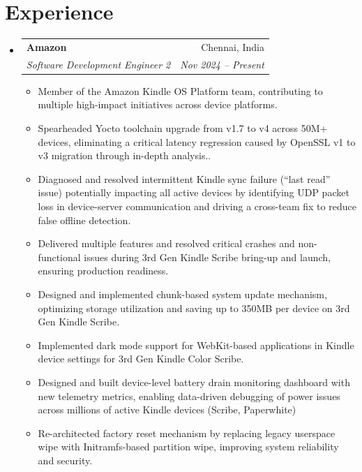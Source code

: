 \documentclass[a4paper,20pt]{article}
\makeatletter
\newcommand{\resumeSubheading}[4]{
  \vspace{-2pt}\item
    \begin{tabular*}{0.97\textwidth}{l@{\extracolsep{\fill}}r}
      \textbf{#1} & #2 \\
      \textit{#3} & \textit{#4} \\
    \end{tabular*}\vspace{-6pt}
}
\newcommand{\resumeItem}[1]{
  \item \small{#1 \vspace{-2pt}}
}
\makeatother
\begin{document}
\section{Experience}
\begin{itemize}[leftmargin=*]

\resumeSubheading
{Amazon}{Chennai, India}
{Software Development Engineer 2}{Nov 2024 – Present}
\begin{itemize}
\resumeItem{Member of the Amazon Kindle OS Platform team, contributing to multiple high-impact initiatives across device
platforms.}
\resumeItem{Spearheaded Yocto toolchain upgrade from v1.7 to v4 across 50M+ devices, eliminating a critical latency regression caused by OpenSSL v1 to v3 migration through in-depth analysis..}
\resumeItem{Diagnosed and resolved intermittent Kindle sync failure (“last read” issue) potentially impacting all active devices by identifying UDP packet loss in device-server communication and driving a cross-team fix to reduce false offline detection.}
\resumeItem{Delivered multiple features and resolved critical crashes and non-functional issues during 3rd Gen Kindle Scribe bring-up and launch, ensuring production readiness.}
\resumeItem{Designed and implemented chunk-based system update mechanism, optimizing storage utilization and saving up to 350MB per device on 3rd Gen Kindle Scribe.}
\resumeItem{Implemented dark mode support for WebKit-based applications in Kindle device settings for 3rd Gen Kindle Color Scribe.}
\resumeItem{Designed and built device-level battery drain monitoring dashboard with new telemetry metrics, enabling data-driven debugging of power issues across millions of active Kindle devices (Scribe, Paperwhite)}
\resumeItem{Re-architected factory reset mechanism by replacing legacy userspace wipe with Initramfs-based partition wipe, improving system reliability and security.}
\end{itemize}


\end{itemize}
\end{document}
